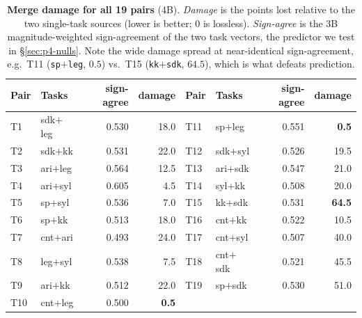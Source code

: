 \documentclass{article}
\begin{document}
\begin{table}[ht]
\centering\small
\caption{\textbf{Merge damage for all 19 pairs} (4B). \emph{Damage} is the points lost relative to
the two single-task sources (lower is better; $0$ is lossless). \emph{Sign-agree} is the 3B
magnitude-weighted sign-agreement of the two task vectors, the predictor we test in
\S\ref{sec:p4-nulls}. Note the wide damage spread at near-identical sign-agreement, e.g.\ T11
(\texttt{sp}$+$\texttt{leg}, $0.5$) vs.\ T15 (\texttt{kk}$+$\texttt{sdk}, $64.5$), which is what
defeats prediction.}
\label{tab:p4-damage19}
\begin{tabular}{llrr@{\hskip 1.6em}llrr}
\toprule
Pair & Tasks & sign-agree & damage & Pair & Tasks & sign-agree & damage\\
\midrule
T1  & sdk$+$leg & 0.530 & 18.0 & T11 & sp$+$leg  & 0.551 & \textbf{0.5}\\
T2  & sdk$+$kk  & 0.531 & 22.0 & T12 & sdk$+$syl & 0.526 & 19.5\\
T3  & ari$+$leg & 0.564 & 12.5 & T13 & ari$+$sdk & 0.547 & 21.0\\
T4  & ari$+$syl & 0.605 & 4.5  & T14 & syl$+$kk  & 0.508 & 20.0\\
T5  & sp$+$syl  & 0.536 & 7.0  & T15 & kk$+$sdk  & 0.531 & \textbf{64.5}\\
T6  & sp$+$kk   & 0.513 & 18.0 & T16 & cnt$+$kk  & 0.522 & 10.5\\
T7  & cnt$+$ari & 0.493 & 24.0 & T17 & cnt$+$syl & 0.507 & 40.0\\
T8  & leg$+$syl & 0.538 & 7.5  & T18 & cnt$+$sdk & 0.521 & 45.5\\
T9  & ari$+$kk  & 0.512 & 22.0 & T19 & sp$+$sdk  & 0.530 & 51.0\\
T10 & cnt$+$leg & 0.500 & \textbf{0.5}  & & & & \\
\bottomrule
\end{tabular}
\end{table}
\end{document}
